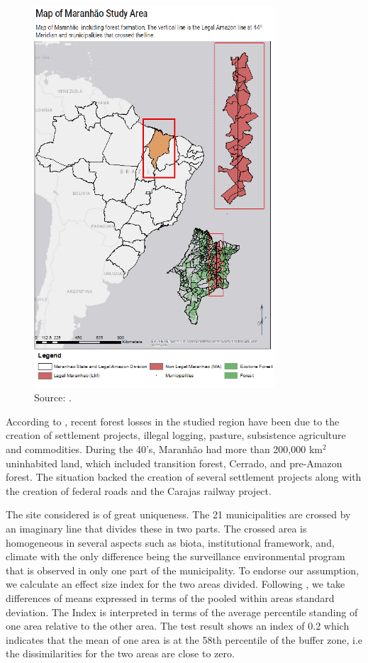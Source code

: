 \begin{figure}[H]
  \centering
  \includegraphics[width=0.8\textwidth, inner]{chp3_studyarea.png}
\caption{Source: \citep{MMMAwebsite,nugeo_2018}.}
\label{fig:delimitacao}
\end{figure}

According to \citet{ferreira_2008, CELENTANO_2017, costa_2018}, recent forest losses in the studied region have been due to the creation of settlement projects, illegal logging, pasture, subsistence agriculture and commodities. During the 40's, Maranhão had more than 200,000 km$^{2}$ uninhabited land, which included transition forest, Cerrado, and pre-Amazon forest. The situation backed the creation of several settlement projects along with the creation of federal roads and the Carajas railway project.

The site considered is of great uniqueness. The 21 municipalities are crossed by an imaginary line that divides these in two parts. The crossed area is homogeneous in several aspects such as biota, institutional framework, and, climate with the only difference being the surveillance environmental program that is observed in only one part of the municipality. To endorse our assumption, we calculate an effect size index for the two areas divided. Following \citet{COHEN1977}, we take differences of means expressed in terms of the pooled within areas standard deviation. The Index is interpreted in terms of the average percentile standing of one area relative to the other area. The test result shows an index of 0.2 which indicates that the mean of one area is at the 58th percentile of the buffer zone, i.e the dissimilarities for the two areas are close to zero.

